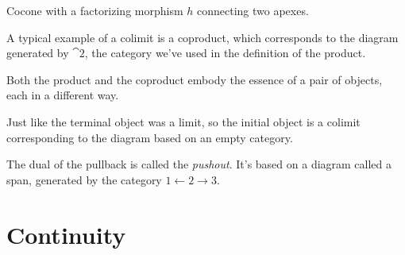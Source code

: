 \begin{figure}[H]
\centering
{}
\end{figure}

\noindent
Cocone with a factorizing morphism $h$ connecting two apexes.

A typical example of a colimit is a coproduct, which corresponds to the
diagram generated by $\cat{2}$, the category we've used in the
definition of the product.

\begin{figure}[H]
\centering
{}
\end{figure}

\noindent
Both the product and the coproduct embody the essence of a pair of
objects, each in a different way.

Just like the terminal object was a limit, so the initial object is a
colimit corresponding to the diagram based on an empty category.

The dual of the pullback is called the \emph{pushout}. It's based on a
diagram called a span, generated by the category
$1\leftarrow2\rightarrow3$.

\section{Continuity}\label{continuity}

